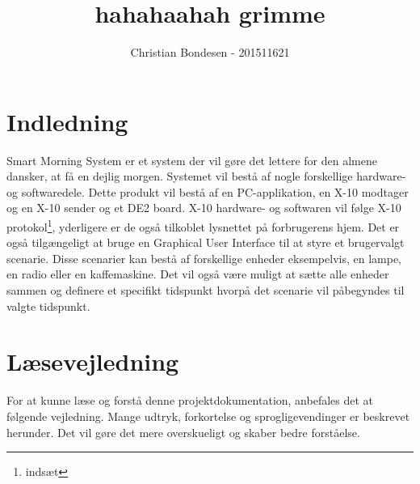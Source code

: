 \documentclass[11pt]{article}
\title{hahahaahah grimme}
\author{Christian Bondesen - 201511621}
\begin{document}
\maketitle

\section{Indledning}

Smart Morning System er et system der vil gøre det lettere for den almene dansker, at få en dejlig morgen. Systemet vil bestå af nogle forskellige hardware- og softwaredele. Dette produkt vil bestå af en PC-applikation, en X-10 modtager og en X-10 sender og et DE2 board. X-10 hardware- og softwaren vil følge X-10 protokol\footnote{indsæt}, yderligere er de også tilkoblet lysnettet på forbrugerens hjem. Det er også tilgængeligt at bruge en Graphical User Interface til at styre et brugervalgt scenarie. Disse scenarier kan bestå af forskellige enheder eksempelvis, en lampe, en radio eller en kaffemaskine. Det vil også være muligt at sætte alle enheder sammen og definere et specifikt tidspunkt hvorpå det scenarie vil påbegyndes til valgte tidspunkt.

\section*{Læsevejledning}
For at kunne læse og forstå denne projektdokumentation, anbefales det at følgende vejledning. Mange udtryk, forkortelse og sprogligevendinger er beskrevet herunder. Det vil gøre det mere overskueligt og skaber bedre forståelse.
\end{document}

